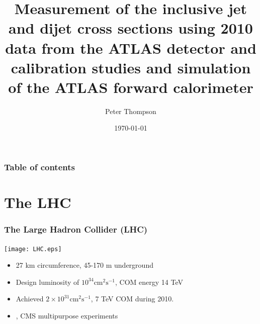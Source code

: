\documentclass[10pt]{beamer}
\begin{document}


\title{Measurement of the inclusive jet and dijet cross sections using 2010 data from the ATLAS detector and calibration studies and simulation of the ATLAS forward calorimeter}%
\author{Peter Thompson}
\date{\today} 
\begin{frame}
\titlepage
\end{frame}






\begin{frame}\frametitle{Table of contents}\tableofcontents
\end{frame} 
\section{The LHC}
\begin{frame}\frametitle{The Large Hadron Collider (LHC)} 
\texttt{[image: LHC.eps]}
\begin{itemize}
\item 27 km circumference, 45-170 m underground
\item Design luminosity of $10^{34} \mathrm{cm}^2\mathrm{s}^{-1}$, COM energy 14 TeV
\item Achieved $2 \times 10^{31} \mathrm{cm}^2\mathrm{s}^{-1}$, 7 TeV COM during 2010.
\item \atlas, CMS multipurpose experiments
\end{itemize}


\end{frame}
\end{document}
